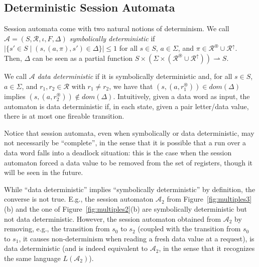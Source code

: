 \documentclass{LMCS}
\newcommand{\pto}{\rightharpoonup}
\newcommand\domain[1]{dom(#1)}
\def\A{\mathcal A}
\newcommand{\Reg}{\mathcal{R}}
\newcommand{\rReg}{\Reg^\uparrow}
\newcommand{\gReg}{\Reg^\circledast}
\newcommand{\gfresh}[1]{#1^\circledast}
\newcommand{\fStates}{F}
\newcommand{\States}{S}
\newcommand{\init}{\iota}
\newcommand{\Trans}{\Delta}
\newcommand{\param}{\pi}
\def\figurename{Figure}
\begin{document}
\subsection{Deterministic Session Automata}

Session automata come with two natural notions of determinism.  We
call $\A=(\States,\Reg,\init,\fStates,\Trans)$ \emph{symbolically
  deterministic} if $|\{s'\in\States\mid (s,(a,\param),s')\in\Trans\}|
\leq 1$ for all $s \in \States$, $a \in \Sigma$, and
$\param\in\gReg\cup\rReg$. Then, $\Trans$ can be seen as a partial
function $\States \times (\Sigma \times (\gReg\cup\rReg)) \pto S$.

We call $\A$ \emph{data deterministic} if it is symbolically
deterministic and, for all $s \in \States$, $a \in \Sigma$, and
$r_1,r_2 \in \Reg$ with $r_1 \neq r_2$, we have that
$(s,(a,\gfresh{r_1})) \in \domain \Trans$ implies
$(s,(a,\gfresh{r_2})) \notin \domain\Trans$. Intuitively, given a data
word as input, the automaton is data deterministic if, in each state,
given a pair letter/data value, there is at most one fireable
transition. 

Notice that session automata, even when symbolically or data
deterministic, may not necessarily be ``complete'', in the sense that
it is possible that a run over a data word falls into a deadlock
situation: this is the case when the session automaton forced a data
value to be removed from the set of registers, though it will be seen in
the future.

While ``data deterministic'' implies ``symbolically deterministic'' by
definition, the converse is not true. E.g., the session automaton
$\A_2$ from \figurename~\ref{fig:multiples3}(b) and
the one of \figurename~\ref{fig:multiples2}(b) are
symbolically deterministic but not data deterministic. However, the
session automaton
obtained from $\A_2$ by removing, e.g., the transition from $s_0$ to
$s_2$ (coupled with the transition from $s_0$ to $s_1$, it causes
non-determinism when reading a fresh data value at a request), is data
deterministic (and is indeed equivalent to $\A_2$, in the sense that
it recognizes the same language $L(\A_2)$).
\end{document}
